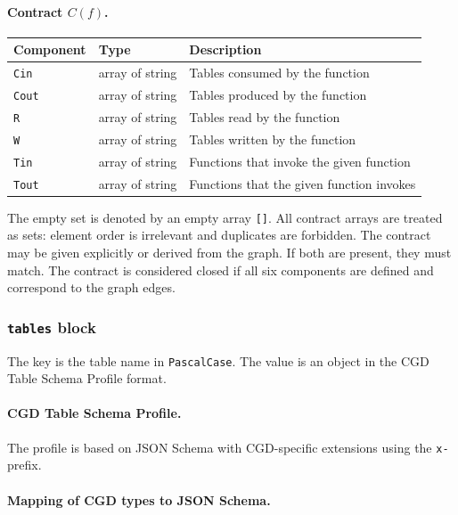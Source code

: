 \paragraph{Contract $C(f)$.}

\begin{tabular}{lll}
\hline
\textbf{Component} & \textbf{Type} & \textbf{Description} \\
\hline
\texttt{Cin} & array of string & Tables consumed by the function \\
\texttt{Cout} & array of string & Tables produced by the function \\
\texttt{R} & array of string & Tables read by the function \\
\texttt{W} & array of string & Tables written by the function \\
\texttt{Tin} & array of string & Functions that invoke the given function \\
\texttt{Tout} & array of string & Functions that the given function invokes \\
\hline
\end{tabular}

\vspace{0.5em}
The empty set is denoted by an empty array \texttt{[]}. All contract arrays are treated as sets: element order is irrelevant and duplicates are forbidden. The contract may be given explicitly or derived from the graph. If both are present, they must match. The contract is considered closed if all six components are defined and correspond to the graph edges.

\subsubsection{\texttt{tables} block}

The key is the table name in \texttt{PascalCase}. The value is an object in the CGD Table Schema Profile format.

\paragraph{CGD Table Schema Profile.}

The profile is based on JSON Schema with CGD-specific extensions using the \texttt{x-} prefix.

\paragraph{Mapping of CGD types to JSON Schema.}


